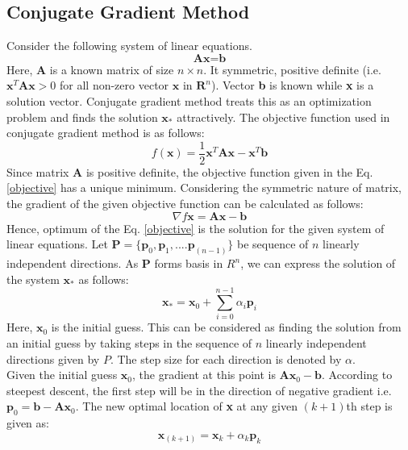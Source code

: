 \documentclass[sigplan,screen]{acmart}
\begin{document}
\subsection{Conjugate Gradient Method}
Consider the following system of linear equations.
\begin{equation}
\textbf{Ax}=\textbf{b}
\end{equation}
Here, \textbf{A} is a known matrix of size $n\times n$. It symmetric, positive definite (i.e. $\textbf{x}^T\textbf{A}\textbf{x} >0$ for all non-zero vector $\textbf{x}$ in $\textbf{R}^n$). Vector \textbf{b} is known while \textbf{x} is a solution vector. Conjugate gradient method treats this as an optimization problem and finds the solution $\textbf{x}_*$ attractively. The objective function used in conjugate gradient method is as follows:
\begin{equation}\label{objective}
f(\textbf{x})= \frac{1}{2}\textbf{x}^T\textbf{A}\textbf{x}-\textbf{x}^T\textbf{b}
\end{equation}
Since matrix \textbf{A} is positive definite, the objective function given in the Eq. \eqref{objective} has a unique minimum. Considering the symmetric nature of matrix, the gradient of the given objective function can be calculated as follows:
\begin{equation}
\nabla f{\textbf{x}} = \textbf{Ax}-\textbf{b}
\end{equation}
Hence, optimum of the Eq. \eqref{objective} is the solution for the given system of linear equations.
Let $\textbf{P}=\{\textbf{p}_0, \textbf{p}_1, ....\textbf{p}_{(n-1)}\}$ be sequence of $n$ linearly independent directions. As $\textbf{P}$ forms basis in $R^n$, we can express the solution of the system $\textbf{x}_*$ as follows:
\begin{equation}
\textbf{x}_*= \textbf{x}_0 + \sum_{i=0}^{n-1}\alpha_i\textbf{p}_i
\end{equation}
Here, $\textbf{x}_0$ is the initial guess. This can be considered as finding the solution from an initial guess by taking steps in the sequence of $n$ linearly independent directions given by $P$. The step size for each direction is denoted by $\alpha$.\\
Given the initial guess $\textbf{x}_0$, the gradient at this point is $\textbf{Ax}_0-\textbf{b}$. According to steepest descent, the first step will be in the direction of negative gradient i.e. $\textbf{p}_0= \textbf{b}-\textbf{Ax}_0$. The new optimal location of \textbf{x} at any given $(k+1)$th step is given as:
\begin{equation}
\textbf{x}_{(k+1)}=\textbf{x}_k+\alpha_k\textbf{p}_k
\end{equation}
\end{document}

